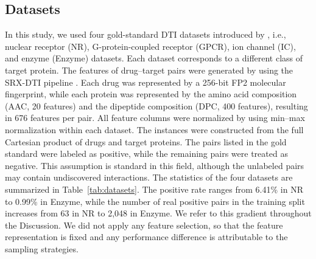 \documentclass[10pt,a4paper]{article}
\begin{document}
\subsection{Datasets}
In this study, we used four gold-standard DTI datasets introduced by
\citet{yamanishi2008prediction}, i.e., nuclear receptor (NR),
G-protein-coupled receptor (GPCR), ion channel (IC), and enzyme (Enzyme)
datasets. Each dataset corresponds to a different class of target
protein. The features of drug--target pairs were generated by using the
SRX-DTI pipeline \citep{khojasteh2023improving}. Each drug was
represented by a 256-bit FP2 molecular fingerprint, while each protein
was represented by the amino acid composition (AAC, 20 features) and the
dipeptide composition (DPC, 400 features), resulting in 676 features per
pair. All feature columns were normalized by using min--max normalization
within each dataset. The instances were constructed from the full
Cartesian product of drugs and target proteins. The pairs listed in the
gold standard were labeled as positive, while the remaining pairs were
treated as negative. This assumption is standard in this field, although
the unlabeled pairs may contain undiscovered interactions. The statistics
of the four datasets are summarized in Table~\ref{tab:datasets}. The
positive rate ranges from 6.41\% in NR to 0.99\% in Enzyme, while the
number of real positive pairs in the training split increases from 63 in
NR to 2{,}048 in Enzyme. We refer to this gradient throughout the
Discussion. We did not apply any feature selection, so that the feature
representation is fixed and any performance difference is attributable
to the sampling strategies.

\begin{table}[htbp]
\centering
\caption{The statistics of the four gold-standard DTI datasets with the
stratified 70/30 split.}
\label{tab:datasets}
\end{table}
\end{document}
